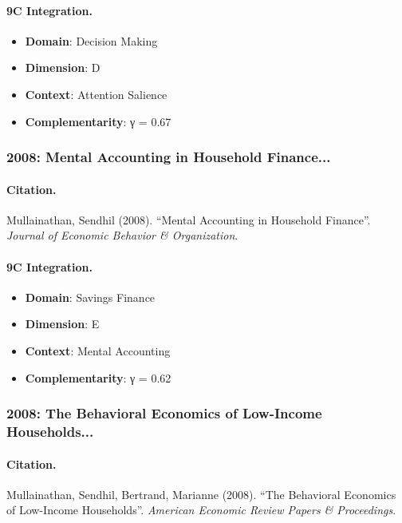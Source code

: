\paragraph{9C Integration.}
\begin{itemize}[nosep]
  \item \textbf{Domain}: Decision Making
  \item \textbf{Dimension}: D
  \item \textbf{Context}: Attention Salience
  \item \textbf{Complementarity}: γ = 0.67
\end{itemize}


\subsubsection{2008: Mental Accounting in Household Finance...}

\paragraph{Citation.}
Mullainathan, Sendhil (2008). ``Mental Accounting in Household Finance''. \textit{Journal of Economic Behavior & Organization}.

\paragraph{9C Integration.}
\begin{itemize}[nosep]
  \item \textbf{Domain}: Savings Finance
  \item \textbf{Dimension}: E
  \item \textbf{Context}: Mental Accounting
  \item \textbf{Complementarity}: γ = 0.62
\end{itemize}


\subsubsection{2008: The Behavioral Economics of Low-Income Households...}

\paragraph{Citation.}
Mullainathan, Sendhil, Bertrand, Marianne (2008). ``The Behavioral Economics of Low-Income Households''. \textit{American Economic Review Papers & Proceedings}.

